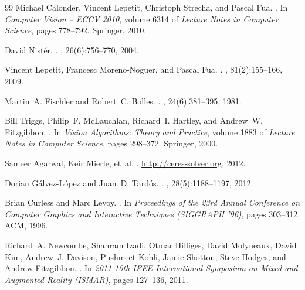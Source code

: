 \documentclass[10pt]{article}
\begin{document}
\begin{thebibliography}{99}
Michael Calonder, Vincent Lepetit, Christoph Strecha, and Pascal Fua.
.
\newblock In {\em Computer Vision -- ECCV 2010}, volume 6314 of {\em Lecture
  Notes in Computer Science}, pages 778--792. Springer, 2010.

David Nist\'{e}r.
.
,
  26(6):756--770, 2004.

Vincent Lepetit, Francesc Moreno-Noguer, and Pascal Fua.
.
, 81(2):155--166, 2009.

Martin~A. Fischler and Robert~C. Bolles.
.
, 24(6):381--395, 1981.

Bill Triggs, Philip~F. McLauchlan, Richard~I. Hartley, and Andrew~W.
  Fitzgibbon.
.
\newblock In {\em Vision Algorithms: Theory and Practice}, volume 1883 of {\em
  Lecture Notes in Computer Science}, pages 298--372. Springer, 2000.

Sameer Agarwal, Keir Mierle, et~al.
.
\newblock \url{http://ceres-solver.org}, 2012.

Dorian G\'{a}lvez-L\'{o}pez and Juan~D. Tard\'{o}s.
.
, 28(5):1188--1197, 2012.

Brian Curless and Marc Levoy.
.
\newblock In {\em Proceedings of the 23rd Annual Conference on Computer
  Graphics and Interactive Techniques (SIGGRAPH '96)}, pages 303--312. ACM,
  1996.

Richard~A. Newcombe, Shahram Izadi, Otmar Hilliges, David Molyneaux, David Kim,
  Andrew~J. Davison, Pushmeet Kohli, Jamie Shotton, Steve Hodges, and Andrew
  Fitzgibbon.
.
\newblock In {\em 2011 10th IEEE International Symposium on Mixed and Augmented
  Reality (ISMAR)}, pages 127--136, 2011.


\end{thebibliography}
\end{document}

